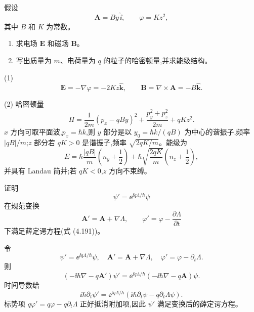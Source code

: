 \begin{question}
假设
\[
\mathbf A=B y\,\hat{\mathbf \ii},\qquad \varphi=Kz^2,
\]
其中 $B$ 和 $K$ 为常数。
\begin{enumerate}
\item 求电场 $\mathbf E$ 和磁场 $\mathbf B$。
\item 写出质量为 $m$、电荷量为 $q$ 的粒子的哈密顿量,并求能级结构。
\end{enumerate}
\end{question}
\begin{solution}

(1) 
\[
\mathbf E=-\nabla\varphi=-2Kz\hat{\mathbf k},
\qquad
\mathbf B=\nabla\times\mathbf A=-B\hat{\mathbf k}.
\]

(2) 哈密顿量
\[
H=\frac{1}{2m}(p_x-qBy)^2+\frac{p_y^2+p_z^2}{2m}+qKz^2.
\]
$x$ 方向可取平面波,$p_x=\hbar k$,则 $y$ 部分是以 $y_0=\hbar k/(qB)$ 为中心的谐振子,频率 $|qB|/m$;$z$ 部分若 $qK>0$ 是谐振子,频率 $\sqrt{2qK/m}$。能级为
\[
E=\hbar\frac{|qB|}{m}\left(n_y+\frac12\right)+\hbar\sqrt{\frac{2qK}{m}}\left(n_z+\frac12\right),
\]
并具有 Landau 简并;若 $qK<0$,$z$ 方向不束缚。

\end{solution}

\begin{question}
证明
\[
\psi'=\ee^{\ii q\Lambda/\hbar}\psi
\]
在规范变换
\[
\mathbf A'=\mathbf A+\nabla\Lambda,
\qquad \varphi'=\varphi-\frac{\partial\Lambda}{\partial t}
\]
下满足薛定谔方程(式 (4.191))。

\par\smallskip
{}

\end{question}
\begin{solution}

令
\[
\psi'=\ee^{\ii q\Lambda/\hbar}\psi,
\quad
\mathbf A'=\mathbf A+\nabla\Lambda,
\quad
\varphi'=\varphi-\partial_t\Lambda.
\]
则
\[
(-\ii\hbar\nabla-q\mathbf A')\psi'
=\ee^{\ii q\Lambda/\hbar}(-\ii\hbar\nabla-q\mathbf A)\psi.
\]
时间导数给
\[
\ii\hbar\partial_t\psi'=\ee^{\ii q\Lambda/\hbar}(\ii\hbar\partial_t\psi-q\partial_t\Lambda\psi).
\]
标势项 $q\varphi'=q\varphi-q\partial_t\Lambda$ 正好抵消附加项,因此 $\psi'$ 满足变换后的薛定谔方程。

\end{solution}

